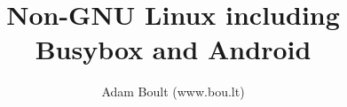 \documentclass[oneside]{book}
\begin{document}
\author{Adam Boult (www.bou.lt)}
\title{Non-GNU Linux including Busybox and Android}
\maketitle

\setcounter{tocdepth}{0}
\tableofcontents


\end{document}
